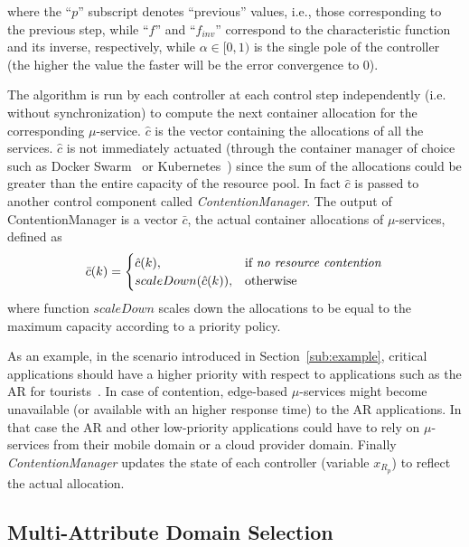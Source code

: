 where the ``$p$'' subscript denotes ``previous'' values, i.e., those corresponding to the previous step, while ``$f$'' and ``$f_{inv}$'' correspond to the characteristic function and its inverse, respectively, while $\alpha \in [0,1)$ is the single pole of the controller (the higher the value the faster will be the error convergence to $0$). 

The algorithm is run by each controller at each control step independently (i.e. without synchronization) to compute the next container allocation for the corresponding $\mu$-service. $\hat{c}$ is the vector containing the allocations of all the services. $\hat{c}$ is not immediately actuated (through the container manager of choice such as Docker Swarm~\cite{Swarm} or Kubernetes~\cite{Kubernetes}) since the sum of the allocations could be greater than the entire capacity of the resource pool. In fact $\hat{c}$  is passed to another control component called  \textit{ContentionManager}. The  output of ContentionManager is a vector $\bar{c}$, the actual container allocations of $\mu$-services, defined as 
\begin{equation}
\bar{c}(k) =
\begin{cases}
\hat{c}(k),& \text{if \textit{no resource contention}}\\
scaleDown(\hat{c}(k)),              & \text{otherwise}
\end{cases}
\label{eqn:CsysModel-SS}
\end{equation} 
where function $scaleDown$ scales down the allocations to be equal to the maximum capacity according to a priority policy. 

As an example, in the scenario introduced in Section~\ref{sub:example}, critical applications should have a higher priority with respect to applications such as the AR for tourists~\cite{GarrigaMendonca2017}. In case of contention, edge-based $\mu$-services might become unavailable (or available with an higher response time) to the AR applications. In that case the AR and other low-priority applications could have to rely on $\mu$-services from their mobile domain or a cloud provider domain. Finally \textit{ContentionManager} updates the state of each controller (variable $x_{R_p}$) to reflect the actual allocation.

\subsection{Multi-Attribute Domain Selection}~\label{sec:cs_allocation}

